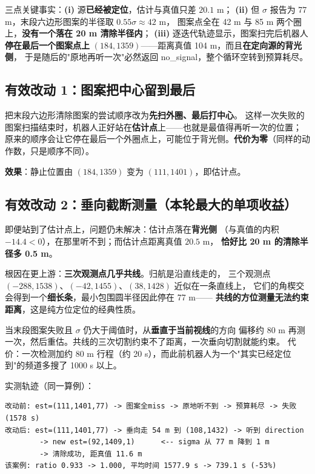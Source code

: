 三点关键事实：\textbf{(i)} 源\textbf{已经被定位}，估计与真值只差 $20.1$ m；
\textbf{(ii)} 但 $\sigma$ 报告为 77 m，末段六边形图案的半径取 $0.55\sigma\approx42$ m，
图案点全在 42 m 与 85 m 两个圈上，\textbf{没有一个落在 20 m 清除半径内}；
\textbf{(iii)} 逐迭代轨迹显示，图案扫完后机器人\textbf{停在最后一个图案点上}
$(184,1359)$——距离真值 104 m，而且\textbf{在定向源的背光侧}，
于是随后的"原地再听一次"必然返回 no\_signal，整个循环空转到预算耗尽。

\subsection{有效改动 1：图案把中心留到最后}

\begin{keybox}[title=改动]
把末段六边形清除图案的尝试顺序改为\textbf{先扫外圈、最后打中心}。
这样一次失败的图案扫描结束时，机器人正好站在\textbf{估计点}上——也就是最值得再听一次的位置；
原来的顺序会让它停在最后一个外圈点上，可能位于背光侧。\textbf{代价为零}（同样的动作数，只是顺序不同）。
\end{keybox}

\noindent\textbf{效果}：静止位置由 $(184,1359)$ 变为 $(111,1401)$，即估计点。

\subsection{有效改动 2：垂向截断测量（本轮最大的单项收益）}

即便站到了估计点上，问题仍未解决：估计点落在\textbf{背光侧}
（与真值的内积 $-14.4<0$），在那里听不到；而估计点距离真值 $20.5$ m，
\textbf{恰好比 20 m 的清除半径多 0.5 m}。

根因在更上游：\textbf{三次观测点几乎共线}。归航是沿直线走的，
三个观测点 $(-288,1538)$、$(-42,1455)$、$(38,1428)$ 近似在一条直线上，
它们的角楔交会得到一个\textbf{细长条}，最小包围圆半径因此停在 77 m——
\textbf{共线的方位测量无法约束距离}，这是纯方位定位的经典性质。

\begin{keybox}[title=改动]
当末段图案失败且 $\sigma$ 仍大于阈值时，从\textbf{垂直于当前视线}的方向
偏移约 80 m 再测一次，然后重估。共线的三次切割约束不了距离，一次垂向切割就能约束。
代价：一次检测加约 80 m 行程（约 20 s），而此前机器人为一个"其实已经定位到"的频道多搜了 1000 s 以上。
\end{keybox}

实测轨迹（同一算例）：

\begin{lstlisting}[caption={垂向截断前后}]
改动前: est=(111,1401,77) -> 图案全miss -> 原地听不到 -> 预算耗尽 -> 失败 (1578 s)
改动后: est=(111,1401,77) -> 垂向走 54 m 到 (108,1432) -> 听到 direction
        -> new est=(92,1409,1)      <-- sigma 从 77 m 降到 1 m
        -> 清除成功, 距真值 11.6 m
该案例: ratio 0.933 -> 1.000, 平均时间 1577.9 s -> 739.1 s (-53%)
\end{lstlisting}

